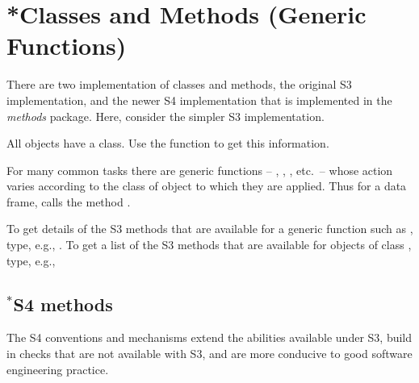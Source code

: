 \section{*Classes and Methods (Generic Functions)}\label{sec:generic}

\vspace*{6pt}
%

There are two implementation of classes and methods, the original S3
implementation, and the newer S4 implementation that is implemented in
the \textit{methods} package. Here, consider the simpler S3
implementation.

All objects have a class. Use the function  to get this
information.

For many common tasks there are generic functions --
, , , etc.\ -- whose action
varies according to the class of object to which they are applied.
Thus for a data frame,  calls the method
. 


To get details of the S3 methods that are available for a generic
function such as , type, e.g.,
. To get a list of the S3 methods that are available for
  objects of class , type, e.g.,

\subsection{$^*$S4 methods}\label{ss:S4}
   The S4 conventions and mechanisms extend the abilities
available under S3, build in checks that are not available with S3,
and are more conducive to good software engineering practice.

